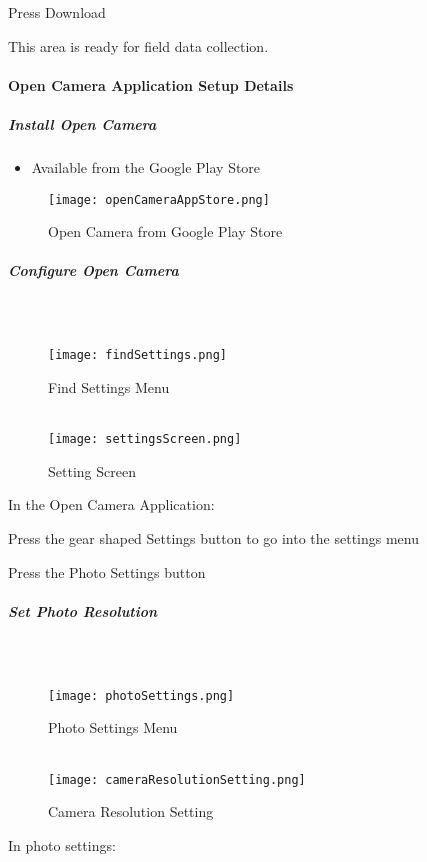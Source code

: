 \documentclass[class=article , crop=false, titlepage, twoside, multi={itemize, figure, verbatim}, float=false]{standalone}
\begin{document}
\noindent Press Download \\
\vspace{3.5in}

\noindent This area is ready for field data collection.

\clearpage
\paragraph{Open Camera Application Setup Details}

\subparagraph{Install Open Camera}
\begin{itemize}
\item Available from the Google Play Store
\end{itemize}
\begin{figure}[h!]
\centering
    \texttt{[image: openCameraAppStore.png]}
\caption{Open Camera from Google Play Store}
\end{figure}

\clearpage
\subparagraph{Configure Open Camera}

\subparagraph*{\\}
\begin{wrapfigure}{r}{0.5\textwidth}
\centering
\texttt{[image: findSettings.png]}
\caption{Find Settings Menu}
\vspace{.25in}
\HRule \\[.4cm] %
\vspace{.25in}
\texttt{[image: settingsScreen.png]}
\caption{Setting Screen}
\end{wrapfigure}
In the Open Camera Application:\\
\vspace{1in}

\noindent Press the gear shaped \Large Settings \normalsize button to go into the settings menu\\
\vspace{3in}

\noindent Press the \Large Photo Settings \normalsize button\\

\clearpage
\subparagraph*{Set Photo Resolution}

\subparagraph*{\\}
\begin{wrapfigure}{r}{0.5\textwidth}
\centering
\texttt{[image: photoSettings.png]}
\caption{Photo Settings Menu}
\vspace{.25in}
\HRule \\[.4cm] %
\vspace{.25in}
\texttt{[image: cameraResolutionSetting.png]}
\caption{Camera Resolution Setting}
\end{wrapfigure}
In \Large photo settings:\\
\vspace{1in}
\end{document}

